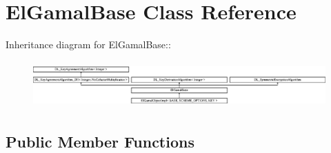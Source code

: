 \hypertarget{class_el_gamal_base}{
\section{ElGamalBase Class Reference}
\label{class_el_gamal_base}
}
Inheritance diagram for ElGamalBase::\begin{figure}[H]
\begin{center}
\leavevmode
\includegraphics[height=1.7992cm]{class_el_gamal_base}
\end{center}
\end{figure}
\subsection*{Public Member Functions}
